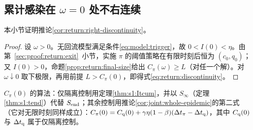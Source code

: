 \subsection{累计感染在 \texorpdfstring{$\omega=0$}{ω=0} 处不右连续}
\label{sec:proof:return:discontinuity}
本小节证明推论\ref{cor:return:right-discontinuity}。
\begin{proof}
设 $\omega>0$。无回流模型满足条件\eqref{eq:model:trigger}，故 $0<I(0)<\eta$。由第~\ref{sec:proof:return:exit}~小节，实施 $\pi$ 的阈值策略在有限时刻后恒为 $(c_0,q_0)$；又 $I(0)>0$，命题\ref{prop:return:final-size}给出 $C_\pi(\omega)\ge L$（对任一个解）。对 $\omega\downarrow0$ 取下极限，再用前提 $L>C_\pi(0)$，即得式\eqref{eq:return:discontinuity}。
\end{proof}
$C_\pi(0)$ 的算法：仅隔离控制用定理\ref{thm:s1:Itcum}，并以 $S_\infty$（定理\ref{thm:s1:tend}）代替 $S_{\rm end}$；其余控制用推论\ref{cor:joint:whole-epidemic}的第二式（它对无限时刻同样成立）：$C_\pi(0)=C_{\rm q}(0)+\gamma\eta(1-\beta)(\Delta t_\pi-\Delta t_{\rm q})$，其中 $C_{\rm q}(0)$ 与 $\Delta t_{\rm q}$ 属于仅隔离控制。

